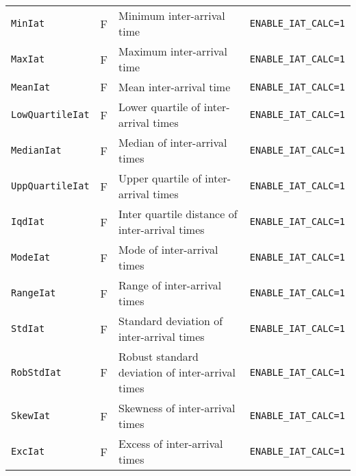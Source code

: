 \documentclass[documentation]{subfiles}
\begin{document}
\begin{longtable}{llll}
    {\tt MinIat}         & F & Minimum inter-arrival time                       & {\tt ENABLE\_IAT\_CALC=1}\\
    {\tt MaxIat}         & F & Maximum inter-arrival time                       & {\tt ENABLE\_IAT\_CALC=1}\\
    {\tt MeanIat}        & F & Mean inter-arrival time                          & {\tt ENABLE\_IAT\_CALC=1}\\
    {\tt LowQuartileIat} & F & Lower quartile of inter-arrival times            & {\tt ENABLE\_IAT\_CALC=1}\\
    {\tt MedianIat}      & F & Median of inter-arrival times                    & {\tt ENABLE\_IAT\_CALC=1}\\
    {\tt UppQuartileIat} & F & Upper quartile of inter-arrival times            & {\tt ENABLE\_IAT\_CALC=1}\\
    {\tt IqdIat}         & F & Inter quartile distance of inter-arrival times   & {\tt ENABLE\_IAT\_CALC=1}\\
    {\tt ModeIat}        & F & Mode of inter-arrival times                      & {\tt ENABLE\_IAT\_CALC=1}\\
    {\tt RangeIat}       & F & Range of inter-arrival times                     & {\tt ENABLE\_IAT\_CALC=1}\\
    {\tt StdIat}         & F & Standard deviation of inter-arrival times        & {\tt ENABLE\_IAT\_CALC=1}\\
    {\tt RobStdIat}      & F & Robust standard deviation of inter-arrival times & {\tt ENABLE\_IAT\_CALC=1}\\
    {\tt SkewIat}        & F & Skewness of inter-arrival times                  & {\tt ENABLE\_IAT\_CALC=1}\\
    {\tt ExcIat}         & F & Excess of inter-arrival times                    & {\tt ENABLE\_IAT\_CALC=1}\\
    \bottomrule
\end{longtable}



\end{document}
